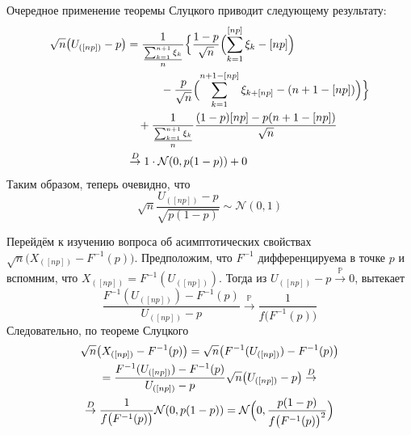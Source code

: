 \documentclass[a4paper]{article}
\newcommand{\Ncal}{\mathcal{N}}
\newcommand{\pr}[0]{{\mathbb{P}}}
\begin{document}
Очередное применение теоремы Слуцкого приводит следующему результату:
\begin{align*}
	\sqrt{n} \bigl( U_{([np])} - p \bigr)
	&= \frac{1}{\frac{\sum_{k=1}^{n+1} \xi_k}{n}}
		\Bigl\{ \frac{1-p}{\sqrt{n}}\Bigl(\sum_{k=1}^{[np]} \xi_k - [np]\Bigr) \\
	& \quad\quad\quad- \frac{p}{\sqrt{n}}\Bigl(\sum_{k=1}^{n+1-[np]} \xi_{k+[np]} - (n+1-[np])\Bigr) \Bigr\}\\
	& \quad + \frac{1}{\frac{\sum_{k=1}^{n+1} \xi_k}{n}} \frac{(1-p)[np] - p(n+1-[np])}{\sqrt{n}} \\
	& \overset{D}{\to} 1 \cdot \Ncal(0, p(1-p)) + 0
\end{align*}
Таким образом, теперь очевидно, что
\[\sqrt{n} \frac{U_{([np])} - p}{\sqrt{p(1-p)}} \sim \Ncal(0, 1)\]

Перейдём к изучению вопроса об асимптотических свойствах $\sqrt{n}\bigl(X_{([np])} - F^{-1}(p)\bigr)$.
Предположим, что $F^{-1}$ дифференцируема в точке $p$ и вспомним, что
$X_{([np])} = F^{-1}(U_{([np])})$. Тогда из $U_{([np])} - p \overset{\pr}{\to} 0$,
вытекает
\[
\frac{F^{-1}(U_{([np])}) - F^{-1}(p)}{U_{([np])} - p}
\overset{\pr}{\to}
\frac{1}{f\bigl(F^{-1}(p)\bigr)}
\]
Следовательно, по теореме Слуцкого
\begin{multline*}
\sqrt{n} \bigl(X_{([np])} - F^{-1}(p)\bigr)
= \sqrt{n} \bigl(F^{-1}(U_{([np])}) - F^{-1}(p)\bigr)\\
= \frac{F^{-1}(U_{([np])}) - F^{-1}(p)}{U_{([np])} - p}
	\sqrt{n} \bigl(U_{([np])} - p\bigr) \overset{D}{\to}\\
\overset{D}{\to} \frac{1}{f\bigl(F^{-1}(p)\bigr)} \Ncal(0, p(1-p))
= \Ncal\Bigl(0, \frac{p(1-p)}{f\bigl(F^{-1}(p)\bigr)^2} \Bigr)
\end{multline*}
\end{document}
